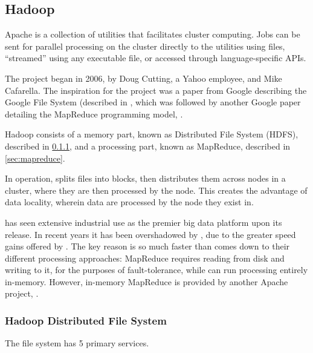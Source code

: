 \subsection{Hadoop}\label{sec:hadoop-1}

Apache  is a collection of utilities that facilitates cluster computing.
Jobs can be sent for parallel processing on the cluster directly to the utilities using  files, ``streamed'' using any executable file, or accessed through language-specific APIs.

The project began in 2006, by Doug Cutting, a Yahoo employee, and Mike Cafarella.
The inspiration for the project was a paper from Google describing the Google File System (described in \textcite{ghemawat2003google}, which was followed by another Google paper detailing the MapReduce programming model, \textcite{dean2004mapreduce}.

Hadoop consists of a memory part, known as  Distributed File System (HDFS), described in \cref{sec:hdfs}, and a processing part, known as MapReduce, described in \cref{sec:mapreduce}.

In operation,  splits files into blocks, then distributes them across nodes in a cluster, where they are then processed by the node.
This creates the advantage of data locality, wherein data are processed by the node they exist in.

 has seen extensive industrial use as the premier big data
platform upon its release.
In recent years it has been overshadowed by , due to the greater speed gains offered by .
The key reason  is so much faster than  comes down to their different processing approaches:  MapReduce requires reading from disk and writing to it, for the purposes of fault-tolerance, while  can run processing entirely in-memory.
However, in-memory MapReduce is provided by another Apache project, \cite{zheludkov2017high}.

\subsubsection{Hadoop Distributed File System}\label{sec:hdfs}

The file system has 5 primary services.

